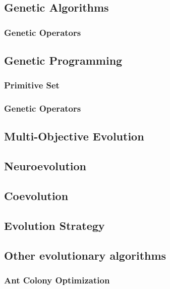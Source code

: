     \subsection{Genetic Algorithms}
    \label{sec:future:ga}
      \subsubsection{Genetic Operators}
      \label{sec:future:ga:operators}
        \Blindtext
    \subsection{Genetic Programming}
    \label{sec:future:gp}
      \subsubsection{Primitive Set}
      \label{sec:future:gp:primitive_set}
        \Blindtext
      \subsubsection{Genetic Operators}
      \label{sec:future:gp:operators}
        \Blindtext
    \subsection{Multi-Objective Evolution}
    \label{sec:future:moe}
      \Blindtext
    \subsection{Neuroevolution}
    \label{sec:future:ne}
      \Blindtext
    \subsection{Coevolution}
    \label{sec:future:coev}
      \Blindtext
    \subsection{Evolution Strategy}
    \label{sec:future:es}
      \Blindtext
    \subsection{Other evolutionary algorithms}
    \label{sec:future:other}
      \subsubsection{Ant Colony Optimization}
